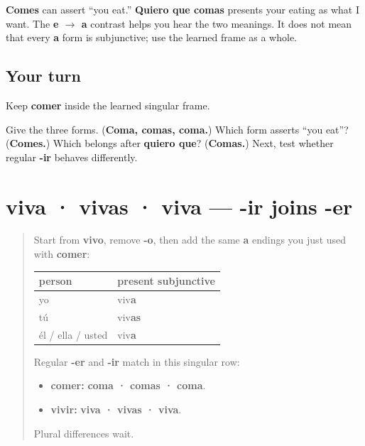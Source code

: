 \begin{grammarlens}[title={Grammar Lens: meaning before machinery}]
\textbf{Comes} can assert “you eat.” \textbf{Quiero que comas} presents your eating as what I want. The \textbf{e $\to$ a} contrast helps you hear the two meanings. It does not mean that every \textbf{a} form is subjunctive; use the learned frame as a whole.
\end{grammarlens}

\subsection*{Your turn}
Keep \textbf{comer} inside the learned singular frame.

\begin{tcolorbox}[breakable,colback=teal!4,colframe=teal!35!black,title={Before you move on}]
Give the three forms. (\textbf{Coma, comas, coma.}) Which form asserts “you eat”? (\textbf{Comes.}) Which belongs after \textbf{quiero que}? (\textbf{Comas.}) Next, test whether regular \textbf{-ir} behaves differently.
\end{tcolorbox}
\section[viva · vivas · viva]{viva · vivas · viva — -ir joins -er}

\label{lesson:ES-C18-vivir-subjuntivo}



\begin{quote}
Start from \textbf{vivo}, remove \textbf{-o}, then add the same \textbf{a} endings you just used with \textbf{comer}:

\noindent
\begin{tabularx}{\linewidth}{@{}>{\raggedright\arraybackslash}X>{\raggedright\arraybackslash}X@{}}
\toprule
\textbf{person} & \textbf{present subjunctive} \\
\midrule
yo & viv\textbf{a} \\
tú & viv\textbf{as} \\
él / ella / usted & viv\textbf{a} \\
\bottomrule
\end{tabularx}

Regular \textbf{-er} and \textbf{-ir} match in this singular row:

\begin{itemize}
\raggedright
  \item \textbf{comer:} \textbf{coma · comas · coma}.
  \item \textbf{vivir:} \textbf{viva · vivas · viva}.
\end{itemize}

Plural differences wait.
\end{quote}

